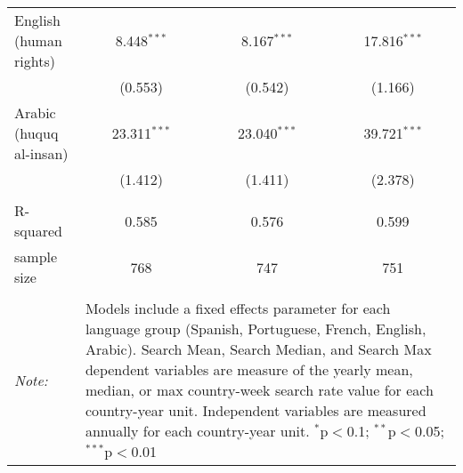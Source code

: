 \begin{table}[!htbp]
\begin{tabular}{@{\extracolsep{5pt}}lccc}
  English (human rights) & 8.448$^{***}$ & 8.167$^{***}$ & 17.816$^{***}$ \\ 
  & (0.553) & (0.542) & (1.166) \\ 
  Arabic (huquq al-insan) & 23.311$^{***}$ & 23.040$^{***}$ & 39.721$^{***}$ \\ 
  & (1.412) & (1.411) & (2.378) \\ 
 \hline \\[-1.8ex] 
R-squared  & 0.585 & 0.576 & 0.599 \\ 
sample size  & 768 & 747 & 751 \\ 
\hline 
\hline \\[-1.8ex] 
\textit{Note:}  & \multicolumn{3}{l}{\parbox[t]{8cm}{Models include a fixed effects parameter for each language group (Spanish, Portuguese, French, English, Arabic). Search Mean, Search Median, and Search Max dependent variables are measure of the yearly mean, median, or max country-week search rate value for each country-year unit. Independent variables are measured annually for each country-year unit. $^{*}$p$<$0.1; $^{**}$p$<$0.05; $^{***}$p$<$0.01}} \\ 
\end{tabular} 
\end{table} 
